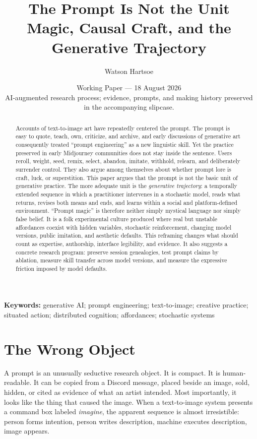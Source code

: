 \documentclass[11pt]{article}
\title{\textbf{The Prompt Is Not the Unit}\\\large Magic, Causal Craft, and the Generative Trajectory}
\author{Watson Hartsoe}
\date{Working Paper --- 18 August 2026\\\small AI-augmented research process; evidence, prompts, and making history preserved in the accompanying slipcase.}
\begin{document}
\maketitle

\begin{abstract}
Accounts of text-to-image art have repeatedly centered the prompt. The prompt is easy to quote, teach, own, criticize, and archive, and early discussions of generative art consequently treated ``prompt engineering'' as a new linguistic skill. Yet the practice preserved in early Midjourney communities does not stay inside the sentence. Users reroll, weight, seed, remix, select, abandon, imitate, withhold, relearn, and deliberately surrender control. They also argue among themselves about whether prompt lore is craft, luck, or superstition. This paper argues that the prompt is not the basic unit of generative practice. The more adequate unit is the \emph{generative trajectory}: a temporally extended sequence in which a practitioner intervenes in a stochastic model, reads what returns, revises both means and ends, and learns within a social and platform-defined environment. ``Prompt magic'' is therefore neither simply mystical language nor simply false belief. It is a folk experimental culture produced where real but unstable affordances coexist with hidden variables, stochastic reinforcement, changing model versions, public imitation, and aesthetic defaults. This reframing changes what should count as expertise, authorship, interface legibility, and evidence. It also suggests a concrete research program: preserve session genealogies, test prompt claims by ablation, measure skill transfer across model versions, and measure the expressive friction imposed by model defaults.
\end{abstract}

\textbf{Keywords:} generative AI; prompt engineering; text-to-image; creative practice; situated action; distributed cognition; affordances; stochastic systems

\section{The Wrong Object}

A prompt is an unusually seductive research object. It is compact. It is human-readable. It can be copied from a Discord message, placed beside an image, sold, hidden, or cited as evidence of what an artist intended. Most importantly, it looks like the thing that caused the image. When a text-to-image system presents a command box labeled \emph{imagine}, the apparent sequence is almost irresistible: person forms intention, person writes description, machine executes description, image appears.
\end{document}

